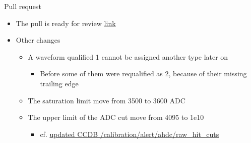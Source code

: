 \documentclass[10pt,aspectratio=43]{beamer}
\begin{document}
\begin{frame}{Pull request}
    \begin{itemize}
        \item The pull is ready for review \href{https://github.com/JeffersonLab/coatjava/pull/1397}{\underline{link}}
        \item Other changes
            \begin{itemize}
                \item A waveform qualified 1 cannot be assigned another type later on
                    \begin{itemize}
                        \item[$\rightarrow$] Before some of them were requalified as 2, because of their missing trailing edge
                    \end{itemize}
                \item The saturation limit move from 3500 to 3600 ADC
                \item The upper limit of the ADC cut move from 4095 to 1e10
                    \begin{itemize}
                        \item[$\rightarrow$] cf. \href{https://clasweb.jlab.org/cgi-bin/ccdb/show_request?request=/calibration/alert/ahdc/raw_hit_cuts:0:default:2026-08-24_06-05-24}{updated CCDB \underline{/calibration/alert/ahdc/raw\_hit\_cuts}}
                    \end{itemize}
            \end{itemize}
    \end{itemize}
    
\end{frame}
\end{document}
